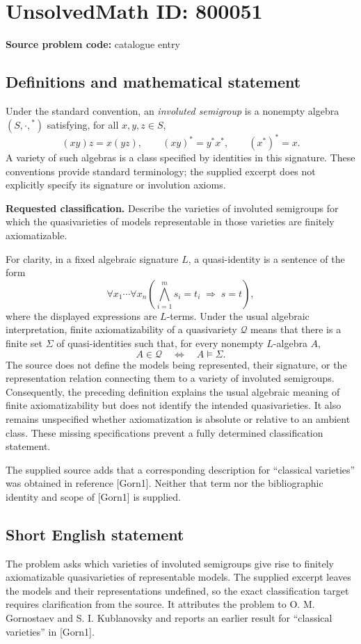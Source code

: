 \documentclass[11pt]{article}
\begin{document}
\section*{UnsolvedMath ID: 800051}
\textbf{Source problem code:} catalogue entry
\subsection{Definitions and mathematical statement}
Under the standard convention, an \emph{involuted semigroup} is a nonempty algebra \((S,\cdot,{}^{*})\) satisfying, for all \(x,y,z\in S\),
\[
(xy)z=x(yz),\qquad (xy)^{*}=y^{*}x^{*},\qquad (x^{*})^{*}=x.
\]
A variety of such algebras is a class specified by identities in this signature. These conventions provide standard terminology; the supplied excerpt does not explicitly specify its signature or involution axioms.

\textbf{Requested classification.} Describe the varieties of involuted semigroups for which the quasivarieties of models representable in those varieties are finitely axiomatizable.

For clarity, in a fixed algebraic signature \(L\), a quasi-identity is a sentence of the form
\[
\forall x_1\cdots\forall x_n\left(\bigwedge_{i=1}^{m}s_i=t_i\;\Longrightarrow\;s=t\right),
\]
where the displayed expressions are \(L\)-terms. Under the usual algebraic interpretation, finite axiomatizability of a quasivariety \(\mathcal Q\) means that there is a finite set \(\Sigma\) of quasi-identities such that, for every nonempty \(L\)-algebra \(A\),
\[
A\in\mathcal Q\quad\Longleftrightarrow\quad A\models\Sigma.
\]
The source does not define the models being represented, their signature, or the representation relation connecting them to a variety of involuted semigroups. Consequently, the preceding definition explains the usual algebraic meaning of finite axiomatizability but does not identify the intended quasivarieties. It also remains unspecified whether axiomatization is absolute or relative to an ambient class. These missing specifications prevent a fully determined classification statement.

The supplied source adds that a corresponding description for ``classical varieties'' was obtained in reference [Gorn1]. Neither that term nor the bibliographic identity and scope of [Gorn1] is supplied.
\subsection{Short English statement}
The problem asks which varieties of involuted semigroups give rise to finitely axiomatizable quasivarieties of representable models. The supplied excerpt leaves the models and their representations undefined, so the exact classification target requires clarification from the source. It attributes the problem to O. M. Gornostaev and S. I. Kublanovsky and reports an earlier result for ``classical varieties'' in [Gorn1].
\end{document}
